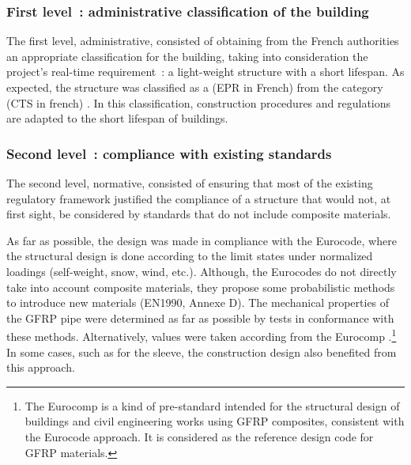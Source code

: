 \subsubsection{First level~: administrative classification of the building}
The first level, administrative, consisted of obtaining from the French authorities an appropriate classification for the building, taking into
consideration the project’s real-time requirement~: a light-weight structure with a short lifespan. As expected, the structure was classified as a  (EPR in French) from the category  (CTS in french) \cite{SiteSecurite}. In this classification, construction procedures and regulations are adapted to the short lifespan of buildings.

\subsubsection{Second level~: compliance with existing standards}
The second level, normative, consisted of ensuring that most of the existing regulatory framework justified the compliance of a structure that would not, at first sight, be considered by standards that do not include composite materials.

As far as possible, the design was made in compliance with the Eurocode, where the structural design is done according to the limit states under normalized loadings (self-weight, snow, wind, etc.). Although, the Eurocodes do not directly take into account composite materials, they propose some probabilistic methods to introduce new materials (EN1990, Annexe D). The mechanical properties of the GFRP pipe were determined as far as possible by tests in conformance with these methods. Alternatively, values were taken according from the Eurocomp \cite{Clarke2003}.\footnote{The Eurocomp is a kind of pre-standard intended for the structural design of buildings and civil engineering works using GFRP composites, consistent with the Eurocode approach. It is considered as the reference design code for GFRP materials.} In some cases, such as for the sleeve, the construction design also benefited from this approach.


